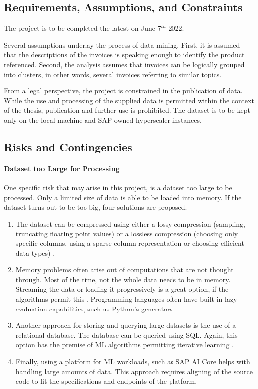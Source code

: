 \subsection{Requirements, Assumptions, and Constraints}
The project is to be completed the latest on June 7$^{th}$ 2022. 

Several assumptions underlay the process of data mining. First, it is assumed that the descriptions of the invoices is speaking enough to identify the product referenced.
Second, the analysis assumes that invoices can be logically grouped into clusters, in other words, several invoices referring to similar topics.

From a legal perspective, the project is constrained in the publication of data. While the use and processing of the supplied data is permitted within the context of the thesis, publication and further use is prohibited. The dataset is to be kept only on the local machine and SAP owned hyperscaler instances.

\subsection{Risks and Contingencies}
\paragraph{Dataset too Large for Processing} One specific risk that may arise in this project, is a dataset too large to be processed. Only a limited size of data is able to be loaded into memory. If the dataset turns out to be too big, four solutions are proposed.

\begin{enumerate}
	\item The dataset can be compressed using either a lossy compression (sampling, truncating floating point values) or a lossless compression (choosing only specific columns, using a sparse-column representation or choosing efficient data types) \cite{largeDataSetMedium}.
	\item Memory problems often arise out of computations that are not thought through. Most of the time, not the whole data needs to be in memory. Streaming the data or loading it progressively is a great option, if the algorithms permit this \cite{largeDataSetBrownlee}. Programming languages often have built in lazy evaluation capabilities, such as Python's generators.
	\item Another approach for storing and querying large datasets is the use of a relational database. The database can be queried using \ac{SQL}. Again, this option has the premise of \ac{ML} algorithms permitting iterative learning \cite{largeDataSetBrownlee}. 
	\item Finally, using a platform for \ac{ML} workloads, such as SAP AI Core helps with handling large amounts of data. This approach requires aligning of the source code to fit the specifications and endpoints of the platform.
\end{enumerate}

